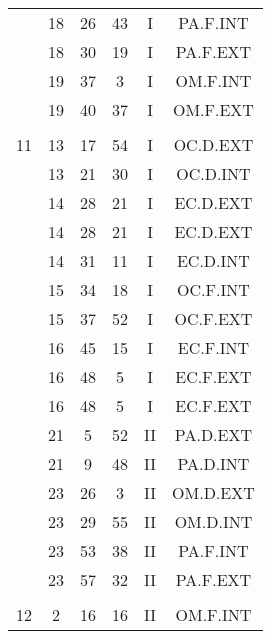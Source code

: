 \documentclass[12pt, a4paper]{article}
\begin{document}
\begin{multicols}{3}
{\begin{tabular}{c c c c c c}
	 	 	 	 & 18 & 26 & 43 & I & PA.F.INT\\%
	 	 	 	 & 18 & 30 & 19 & I & PA.F.EXT\\%
	 	 	 	 & 19 & 37 & 3 & I & OM.F.INT\\%
	 	 	 	 & 19 & 40 & 37 & I & OM.F.EXT\\%
	 	 	 	 & & & & & \\%
	 	 	 	11 & 13 & 17 & 54 & I & OC.D.EXT\\%
	 	 	 	 & 13 & 21 & 30 & I & OC.D.INT\\%
	 	 	 	 & 14 & 28 & 21 & I & EC.D.EXT\\%
	 	 	 	 & 14 & 28 & 21 & I & EC.D.EXT\\%
	 	 	 	 & 14 & 31 & 11 & I & EC.D.INT\\%
	 	 	 	 & 15 & 34 & 18 & I & OC.F.INT\\%
	 	 	 	 & 15 & 37 & 52 & I & OC.F.EXT\\%
	 	 	 	 & 16 & 45 & 15 & I & EC.F.INT\\%
	 	 	 	 & 16 & 48 & 5 & I & EC.F.EXT\\%
	 	 	 	 & 16 & 48 & 5 & I & EC.F.EXT\\%
	 	 	 	 & 21 & 5 & 52 & II & PA.D.EXT\\%
	 	 	 	 & 21 & 9 & 48 & II & PA.D.INT\\%
	 	 	 	 & 23 & 26 & 3 & II & OM.D.EXT\\%
	 	 	 	 & 23 & 29 & 55 & II & OM.D.INT\\%
	 	 	 	 & 23 & 53 & 38 & II & PA.F.INT\\%
	 	 	 	 & 23 & 57 & 32 & II & PA.F.EXT\\%
	 	 	 	 & & & & & \\%
	 	 	 	12 & 2 & 16 & 16 & II & OM.F.INT\\%
	 	 \end{tabular}
 	}
\end{multicols}
\end{document}
